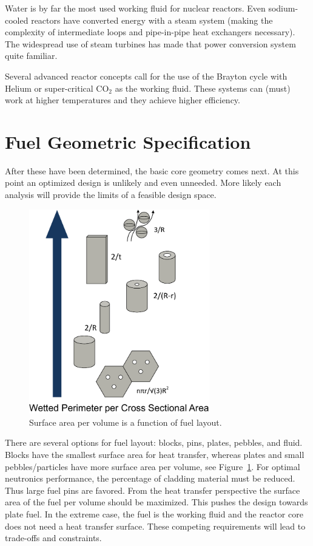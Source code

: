 Water is by far the most used working fluid for nuclear reactors. Even sodium-cooled reactors have converted energy with a steam system (making the complexity of intermediate loops and pipe-in-pipe heat exchangers necessary). 
The widespread use of steam turbines has made that power conversion system quite familiar.

Several advanced reactor concepts call for the use of the Brayton cycle with Helium or super-critical CO$_2$ as the working fluid. These systems can (must) work at higher temperatures and they achieve higher efficiency.


\section{Fuel Geometric Specification}
After these have been determined, the basic core geometry comes next. 
At this point an optimized design is unlikely and even unneeded. More likely each analysis will provide the limits of a feasible design space. 

\begin{figure}[!hbt]
  \label{fig:fuel_geom}
  \centering
  \includegraphics[width=0.70\textwidth]{graphics/SAperVOL.pdf}
  \caption{Surface area per volume is a function of fuel layout.}
\end{figure}

There are several options for fuel layout: blocks, pins, plates, pebbles, and fluid.
Blocks have the smallest surface area for heat transfer, whereas plates and small pebbles/particles have more surface area per volume, see Figure~\ref{fig:fuel_geom}. 
%
%
For optimal neutronics performance, the percentage of cladding material must be reduced. Thus large fuel pins are favored.
From the heat transfer perspective the surface area of the fuel per volume should be maximized. This pushes the design towards plate fuel.
In the extreme case, the fuel is the working fluid and the reactor core does not need a heat transfer surface.
These competing requirements will lead to trade-offs and constraints.

